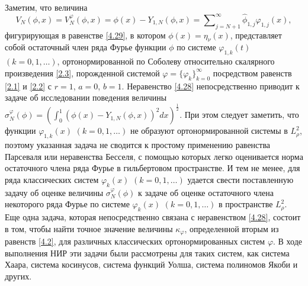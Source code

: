 Заметим,  что величина
\begin{equation}\label{4.30}
V_N(\phi,x)=V_N^\varphi(\phi,x)=\phi(x)- Y_{1,N}(\phi,x)
=\sum\nolimits_{j=N+1}^\infty \hat \phi_{1,j}\varphi_{1,j}(x),
\end{equation}
фигурирующая в равенстве \eqref{4.29}, в котором $\phi(x)=\eta_\nu(x)$, представляет собой остаточный член ряда Фурье функции $\phi$ по системе $\varphi_{1,k}(t)$ $(k=0,1,\ldots)$, ортонормированной  по Соболеву относительно скалярного произведения \eqref{2.3}, порожденной  системой $\varphi=\{\varphi_k\}_{k=0}^\infty$ посредством равенств \eqref{2.1} и \eqref{2.2} с $r=1$, $a=0$, $b=1$.  Неравенство \eqref{4.28} непосредственно приводит к  задаче об исследовании поведения величины $\sigma_N^\varphi(\phi)=(\int_{0}^1(\phi(x)- Y_{1,N}(\phi,x))^2 dx)^\frac12$.
При этом следует заметить, что  функции $\varphi_{1,k}(x)$ $(k=0,1,\ldots)$ не образуют ортонормированной системы в $L^2_{\rho}$, поэтому указанная задача не сводится к простому применению равенства Парсеваля или неравенства Бесселя, с помощью которых легко оценивается норма остаточного члена ряда Фурье в гильбертовом пространстве. И тем не менее, для ряда классических систем $\varphi_k(x)$ $(k=0,1,\ldots)$ удается свести поставленную задачу об оценке величины $\sigma_N^\varphi(\phi)$  к задаче об оценке  остаточного члена некоторого  ряда Фурье по системе $\varphi_k(x)$ $(k=0,1,\ldots)$  в пространстве $L^2_{\rho}$.   Еще одна задача, которая непосредственно связана с неравенством \eqref{4.28}, состоит в том, чтобы найти точное значение величины  $\kappa_\varphi$, определенной вторым из равенств \eqref{4.2}, для различных классических ортонормированных систем $\varphi$. В ходе выполнения НИР эти задачи были рассмотрены для таких систем, как система Хаара, система косинусов, система функций Уолша, система полиномов Якоби и других.


